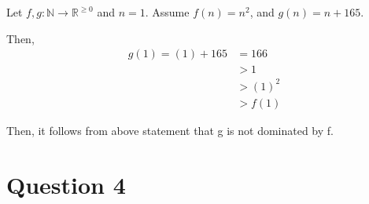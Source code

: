 \documentclass[12pt]{article}
\begin{document}
\begin{enumerate}[a.]
    \bigskip

    Let $f,g:\mathbb{N} \to \mathbb{R}^{\geq 0}$ and $n = 1$. Assume $f(n) = n^2$,
    and $g(n) = n + 165$.

    \bigskip

    Then,
    \setcounter{equation}{0}
    \begin{align}
        g(1) = (1) + 165 &= 166\\
        &> 1\\
        &>(1)^2\\
        &> f(1)
    \end{align}

    \bigskip

    Then, it follows from above statement that g is not dominated by f.

\end{enumerate}

\section*{Question 4}
\end{document}
